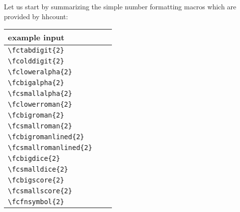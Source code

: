 \documentclass[11pt]{article}
\def\packagename#1{{\sffamily #1}}     %
\def\hhcount{\packagename{hhcount}\xspace}
\def\={\verb=}
\begin{document}
Let us start by summarizing the simple
number formatting macros which are provided by \hhcount:
\begin{center}
\begin{tabular}{|l|c||c|}\hline
  example input         & \vbox{\hbox{corresp.\strut}%
                            \hbox{output\strut}} &
                                               \vbox{\hbox{other example\strut}%
                                                     \hbox{output\strut}} \\
\hline\hline
  \=\fctabdigit{2}=      & \fctabdigit{2}        & \fctabdigit{29}       \\
\hline
  \=\fcolddigit{2}=      & \fcolddigit{2}        & \fcolddigit{29}       \\
\hline
  \=\fcloweralpha{2}=    & \fcloweralpha{2}      & \fcloweralpha{29}     \\
\hline
  \=\fcbigalpha{2}=      & \fcbigalpha{2}        & \fcbigalpha{29}       \\
\hline
  \=\fcsmallalpha{2}=    & \fcsmallalpha{2}      & \fcsmallalpha{29}     \\
\hline
  \=\fclowerroman{2}=    & \fclowerroman{2}      & \fclowerroman{29}     \\
\hline
  \=\fcbigroman{2}=      & \fcbigroman{2}        & \fcbigroman{29}       \\
\hline
  \=\fcsmallroman{2}=    & \fcsmallroman{2}      & \fcsmallroman{29}     \\
\hline
  \=\fcbigromanlined{2}= & \fcbigromanlined{2}   & \fcbigromanlined{29}  \\
\hline
  \=\fcsmallromanlined{2}= & \fcsmallromanlined{2} & \fcsmallromanlined{29} \\
\hline
  \=\fcbigdice{2}=       & \fcbigdice{2}         & \fcbigdice{29}        \\
\hline
  \=\fcsmalldice{2}=     & \fcsmalldice{2}       & \fcsmalldice{29}      \\
\hline
  \=\fcbigscore{2}=      & \fcbigscore{2}        & \fcbigscore{29}       \\
\hline
  \=\fcsmallscore{2}=    & \fcsmallscore{2}      & \fcsmallscore{29}     \\
\hline
  \=\fcfnsymbol{2}=      & \fcfnsymbol{2}        &                       \\
\hline
\end{tabular}
\end{center}
\end{document}
